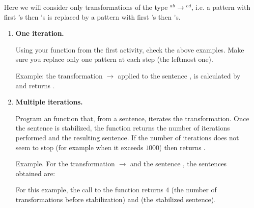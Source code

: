 \documentclass[11pt,class=report,crop=false]{standalone}
\begin{document}

\begin{activite}


Here we will consider only transformations of the type \rzero$^a$\run$^b$$\rightarrow$\run$^c$\rzero$^d$, i.e. a pattern with first \rzero's then \run's is replaced by a pattern with first \run's then \rzero's.



\begin{enumerate}
  \item \textbf{One iteration.}
  
   Using your  function from the first activity, check the above examples. Make sure you replace only one pattern at each step (the leftmost one).
  
  Example: the transformation \rzero\run{} $\rightarrow$ \run\rzero{} applied to the sentence \run\rzero\run, is calculated by  and returns .
   
  \item \textbf{Multiple iterations.}
  
  
  Program an  function that, from a sentence, iterates the transformation. Once the sentence is stabilized, the function returns the number of iterations performed and the resulting sentence. If the number of iterations does not seem to stop (for example when it exceeds $1000$) then returns .
  
  Example. For the transformation \rzero\rzero\run\run{} $\rightarrow$ \run\run\rzero\rzero{} and the sentence \rzero\rzero\rzero\rzero\run\run\rzero\run{}, the sentences obtained are: 
  
{\small
{}
}



For this example, the call to the  function returns $4$ (the number of transformations before stabilization) and  (the stabilized sentence).


\end{enumerate}
\end{activite}
\end{document}
